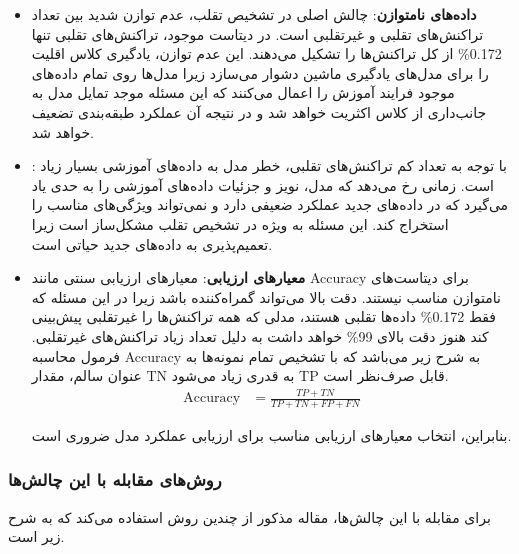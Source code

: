 \documentclass{article}
\begin{document}
\begin{itemize}
    \item \textbf{داده‌های نامتوازن}: 
چالش اصلی در تشخیص تقلب، عدم توازن شدید بین تعداد تراکنش‌های تقلبی و غیرتقلبی است. در دیتاست موجود، تراکنش‌های تقلبی تنها
 0.172\% 
 از کل تراکنش‌ها را تشکیل می‌دهند. این عدم توازن، یادگیری کلاس اقلیت را برای مدل‌های یادگیری ماشین دشوار می‌سازد زیرا مدل‌ها روی تمام داده‌های موجود فرایند آموزش را اعمال می‌کنند که این مسئله موجد تمایل مدل به جانب‌داری از کلاس اکثریت خواهد شد و در نتیجه آن عملکرد طبقه‌بندی تضعیف خواهد شد.
    
    \item \textbf{}: 
با توجه به تعداد کم تراکنش‌های تقلبی، خطر 
 مدل به داده‌های آموزشی بسیار زیاد است. 
 زمانی رخ می‌دهد که مدل، نویز و جزئیات داده‌های آموزشی را به حدی یاد می‌گیرد که در داده‌های جدید عملکرد ضعیفی دارد و نمی‌تواند ویژگی‌های مناسب را استخراج کند. این مسئله به ویژه در تشخیص تقلب مشکل‌ساز است زیرا تعمیم‌پذیری به داده‌های جدید حیاتی است.
    
    \item \textbf{معیارهای ارزیابی}:
معیارهای ارزیابی سنتی مانند 
Accuracy 
 برای دیتاست‌های نامتوازن مناسب نیستند. دقت بالا می‌تواند گمراه‌کننده باشد زیرا در این مسئله که فقط
  0.172\% 
داده‌ها تقلبی هستند، مدلی که همه تراکنش‌ها را غیرتقلبی پیش‌بینی کند هنوز دقت بالای
99\%
 خواهد داشت به دلیل تعداد زیاد تراکنش‌های غیرتقلبی. فرمول محاسبه 
 Accuracy
 به شرح زیر می‌باشد که با تشخیص تمام نمونه‌ها به عنوان سالم، مقدار TN به قدری زیاد می‌شود TP قابل صرف‌نظر است.
 \begin{align}
 \label{facc}
 \text{Accuracy}  &= \frac{TP+TN}{TP+TN+FP+FN}
 \end{align}
 
  بنابراین، انتخاب معیارهای ارزیابی مناسب برای ارزیابی عملکرد مدل ضروری است.
\end{itemize}

\subsubsection{روش‌های مقابله با این چالش‌ها}

برای مقابله با این چالش‌ها، مقاله مذکور از چندین روش استفاده می‌کند که به شرح زیر است.
\end{document}
